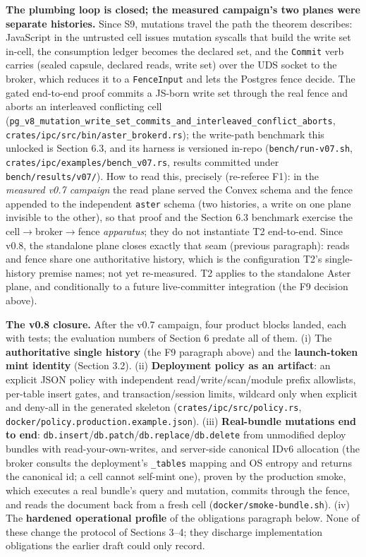 \documentclass[
  11pt,
]{article}
\begin{document}
\textbf{The plumbing loop is closed; the measured campaign's two planes were separate histories.} Since S9, mutations travel the path the theorem describes: JavaScript in the untrusted cell issues mutation syscalls that build the write set in-cell, the consumption ledger becomes the declared set, and the \texttt{Commit} verb carries (sealed capsule, declared reads, write set) over the UDS socket to the broker, which reduces it to a \texttt{FenceInput} and lets the Postgres fence decide. The gated end-to-end proof commits a JS-born write set through the real fence and aborts an interleaved conflicting cell (\texttt{pg\_v8\_mutation\_write\_set\_commits\_and\_interleaved\_conflict\_aborts}, \texttt{crates/ipc/src/bin/aster\_brokerd.rs}); the write-path benchmark this unlocked is Section 6.3, and its harness is versioned in-repo (\texttt{bench/run-v07.sh}, \texttt{crates/ipc/examples/bench\_v07.rs}, results committed under \texttt{bench/results/v07/}). How to read this, precisely (re-referee F1): in the \emph{measured v0.7 campaign} the read plane served the Convex schema and the fence appended to the independent \texttt{aster} schema (two histories, a write on one plane invisible to the other), so that proof and the Section 6.3 benchmark exercise the cell$\rightarrow$broker$\rightarrow$fence \emph{apparatus}; they do not instantiate T2 end-to-end. Since v0.8, the standalone plane closes exactly that seam (previous paragraph): reads and fence share one authoritative history, which is the configuration T2's single-history premise names; not yet re-measured. T2 applies to the standalone Aster plane, and conditionally to a future live-committer integration (the F9 decision above).

\textbf{The v0.8 closure.} After the v0.7 campaign, four product blocks landed, each with tests; the evaluation numbers of Section 6 predate all of them. (i) The \textbf{authoritative single history} (the F9 paragraph above) and the \textbf{launch-token mint identity} (Section 3.2). (ii) \textbf{Deployment policy as an artifact}: an explicit JSON policy with independent read/write/scan/module prefix allowlists, per-table insert gates, and transaction/session limits, wildcard only when explicit and deny-all in the generated skeleton (\texttt{crates/ipc/src/policy.rs}, \texttt{docker/policy.production.example.json}). (iii) \textbf{Real-bundle mutations end to end}: \texttt{db.insert}/\texttt{db.patch}/\texttt{db.replace}/\texttt{db.delete} from unmodified deploy bundles with read-your-own-writes, and server-side canonical IDv6 allocation (the broker consults the deployment's \texttt{\_tables} mapping and OS entropy and returns the canonical id; a cell cannot self-mint one), proven by the production smoke, which executes a real bundle's query and mutation, commits through the fence, and reads the document back from a fresh cell (\texttt{docker/smoke-bundle.sh}). (iv) The \textbf{hardened operational profile} of the obligations paragraph below. None of these change the protocol of Sections 3--4; they discharge implementation obligations the earlier draft could only record.
\end{document}
